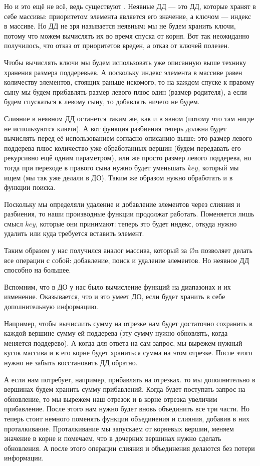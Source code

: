 Но и это ещё не всё, ведь существуют . Неявные ДД — это ДД, которые хранят в себе массивы: приоритетом элемента является его значение, а ключом — индекс в массиве. Но ДД не зря называется неявным: мы не будем хранить ключи, потому что можем вычислять их во время спуска от корня. Вот так неожиданно получилось, что отказ от приоритетов вреден, а отказ от ключей полезен.

Чтобы вычислять ключи мы будем использовать уже описанную выше технику хранения размера поддеревьев. А поскольку индекс элемента в массиве равен количеству элементов, стоящих раньше искомого, то на каждом спуске к правому сыну мы будем прибавлять размер левого плюс один (размер родителя), а если будем спускаться к левому сыну, то добавлять ничего не будем.

Слияние в неявном ДД останется таким же, как и в явном (потому что там нигде не используются ключи). А вот функция разбиения теперь должна будет вычислять  перед её использованием согласно описанию выше: это размер левого поддерева плюс количество уже обработанных вершин (будем передавать его рекурсивно ещё одним параметром), или же просто размер левого поддерева, но тогда при переходе в правого сына нужно будет уменьшать $key$, который мы ищем (мы так уже делали в ДО). Таким же образом нужно обработать и  в функции поиска.

Поскольку мы определяли удаление и добавление элементов через слияния и разбиения, то наши производные функции продолжат работать. Поменяется лишь смысл $key$, которые они принимают: теперь это будет индекс, откуда нужно удалить или куда требуется вставить элемент.

Таким образом у нас получился аналог массива, который за \O{\log n} позволяет делать все операции с собой: добавление, поиск и удаление элементов. Но неявное ДД способно на большее.

Вспомним, что в ДО у нас было вычисление функций на диапазонах и их изменение. Оказывается, что и это умеет ДО, если будет хранить в себе дополнительную информацию.

Например, чтобы вычислить сумму на отрезке нам будет достаточно сохранить в каждой вершине сумму ей поддерева (эту сумму нужно обновлять, когда меняется поддерево). А когда для ответа на сам запрос, мы вырежем нужный кусок массива и в его корне будет храниться сумма на этом отрезке. После этого нужно не забыть восстановить ДД обратно.

А если нам потребует, например, прибавлять на отрезках. то мы дополнительно в вершинах будем хранить сумму прибавлений. Когда будет поступать запрос на обновление, то мы вырежем наш отрезок и в корне отрезка увеличим прибавление. После этого нам нужно будет вновь объединить все три части. Но теперь стоит немного поменять функции объединения и слияния, добавив в них проталкивание. Проталкивание мы запускаем от корневых вершин, меняем значение в корне и помечаем, что в дочерних вершинах нужно сделать обновления. А после этого операции слияния и объединения делаются без потери информации.

